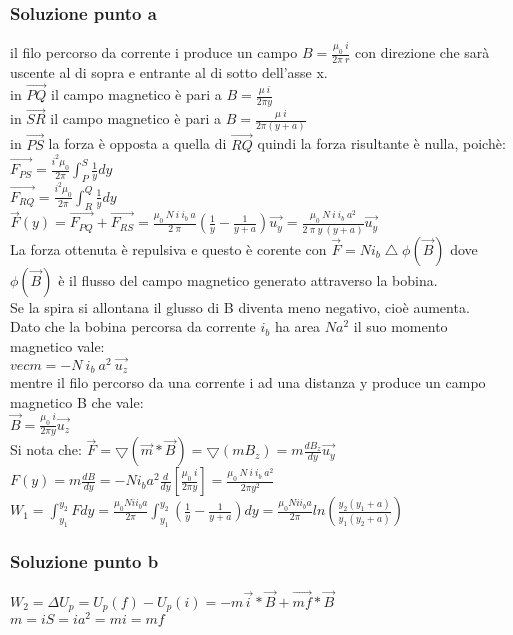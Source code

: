 \documentclass[../../main.tex]{subfiles}
\begin{document}
\subsubsection*{Soluzione punto a}
il filo percorso da corrente i produce un campo $B = \frac{\mu_0\ i}{2\pi\ r}$ con direzione che sarà uscente al di sopra e entrante al di sotto dell'asse x.
\\in $\vec{PQ}$ il campo magnetico è pari a $B = \frac{\mu\ i}{2\pi y}$
\\in $\vec{SR}$ il campo magnetico è pari a $B = \frac{\mu\ i}{2\pi (y+a)}$
\\in $\vec{PS}$ la forza è opposta a quella di $\vec{RQ}$ quindi la forza risultante è nulla, poichè:
\\$\vec{F_{PS}} = \frac{i^2\mu_0}{2\pi}\int_P^S\frac{1}{y}dy$
\\$\vec{F_{RQ}} = \frac{i^2\mu_0}{2\pi}\int_R^Q\frac{1}{y}dy$
\\$\vec{F}(y) = \vec{F_{PQ}} + \vec{F_{RS}} = \frac{\mu_0\ N\ i\ i_b\ a}{2\ \pi}\left(\frac{1}{y}-\frac{1}{y+a}\right)\vec{u_y} = \frac{\mu_0\ N\ i\ i_b\ a^2}{2\ \pi\ y\ (y+a)}\vec{u_y}$
\\La forza ottenuta è repulsiva e questo è corente con $\vec{F} = N i_b \bigtriangleup\phi(\vec{B})$ dove $\phi(\vec{B})$ è il flusso del campo magnetico generato attraverso la bobina.
\\Se la spira si allontana il glusso di B diventa meno negativo, cioè aumenta.
\\Dato che la bobina percorsa da corrente $i_b$ ha area $Na^2$ il suo momento magnetico vale:
\\$vec{m} = -N\ i_b\ a^2\ \vec{u_z}$
\\mentre il filo percorso da una corrente i ad una distanza y produce un campo magnetico B che vale:
\\$\vec{B} = \frac{\mu_0\ i}{2\pi y}\vec{u_z}$
\\Si nota che: $\vec{F} = \bigtriangledown(\vec{m} * \vec{B}) = \bigtriangledown(mB_z) = m\frac{dB_z}{dy}\vec{u_y}$
\\$F(y) = m\frac{dB}{dy} = -Ni_ba^2\frac{d}{dy}\left[\frac{\mu_0\ i}{2\pi y}\right] = \frac{\mu_0\ N\ i\ i_b\ a^2}{2\pi y^2}$
\\$W_1 = \int_{y_1}^{y_2}Fdy = \frac{\mu_0Nii_ba}{2\pi}\int_{y_1}^{y_2}\left(\frac{1}{y}-\frac{1}{y+a}\right)dy = \frac{\mu_0Nii_ba}{2\pi}ln\left(\frac{y_2(y_1+a)}{y_1(y_2+a)}\right)$
\subsubsection*{Soluzione punto b}
$W_2 = \Delta U_p = U_p(f) - U_p(i) = -m\vec{i}*\vec{B}+\vec{mf}*\vec{B}$
\\$m =iS = ia^2 =mi=mf$
\newpage
\end{document}
